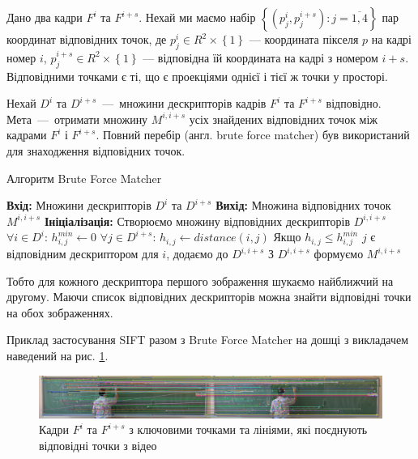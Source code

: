 Дано два кадри \(F^{i}\) та \(F^{i + s}\). Нехай ми маємо набір
\(\left\{ \left( p_{j}^{i},p_{j}^{i + s} \right):j = \overline{1,4} \right\}\)
пар координат відповідних точок, де
\(p_{j}^{i} \in R^{2} \times \left\{ 1 \right\}\) --- координата пікселя
\(p\) на кадрі номер \(i\),
\(p_{j}^{i + s} \in R^{2} \times \left\{ 1 \right\}\) --- відповідна їй
координата на кадрі з номером \(i + s\). Відповідними точками є ті, що є
проекціями однієї і тієї ж точки у просторі.

Нехай $D^i$ та $D^{i+s}$~---~множини дескрипторів кадрів \(F^{i}\) та \(F^{i + s}\)
відповідно. Мета~---~отримати множину \(M^{i,i+s}\) усіх знайдених відповідних точок  між кадрами
\(F^{i}\) і \(F^{i + s}\).
Повний перебір (англ. brute force matcher) був використаний для знаходження відповідних точок.
\begin{algorithm}[H]
    \caption{Алгоритм Brute Force Matcher}
    \begin{algorithmic}
        \State \textbf{Вхід:} Множини дескрипторів $D^i$ та $D^{i+s}$
        \State \textbf{Вихід:} Множина відповідних точок \(M^{i,i+s}\)
        \State \textbf{Ініціалізація:} Створюємо множину відповідних дескрипторів $D^{i,i+s}$
        \State $\forall i \in D^i$:
        \State  \qquad $h^{min}_{i,j} \gets 0$
        \State  \qquad  $\forall j \in D^{i+s}$:
        \State  \qquad \qquad  $h_{i,j} \gets distance(i,j)$
        \State  \qquad \qquad  Якщо {$h_{i,j} \leq h^{min}_{i,j}$}
        \State  \qquad \qquad  \qquad $j$ є відповідним  дескриптором для $i$, додаємо до  $D^{i,i+s}$
        \State З $D^{i,i+s}$ формуємо \(M^{i,i+s}\)
    \end{algorithmic}
    \label{al:brute-force-matcher}
\end{algorithm}

Тобто для кожного дескриптора першого зображення шукаємо найближчий на другому.
Маючи список відповідних дескрипторів можна знайти відповідні точки на обох зображеннях.

Приклад застосування SIFT разом з Brute Force Matcher на
дошці з викладачем наведений на  рис. \ref{fig:matches_img}.

\begin{figure}[H]
    \centering
    \includegraphics[width=1\textwidth]{images/matches_img}
    \caption{Кадри $F^i$ та $F^{i+s}$ з ключовими точками та лініями,
        які поєднують відповідні точки з відео \cite{yakovlev_discrete_math_video}
        \label{fig:matches_img}
    }
\end{figure}
